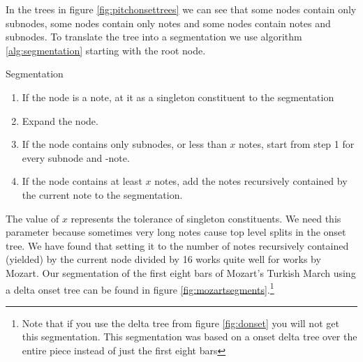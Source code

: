 \documentclass[a4paper,10pt]{article}
\begin{document}
In the trees in figure \ref{fig:pitchonsettrees} we can see that some nodes contain only subnodes, some nodes contain only notes and some nodes contain notes and subnodes. To translate the tree into a segmentation we use algorithm \ref{alg:segmentation} starting with the root node.
\begin{algorithm}
\caption{Segmentation}
\label{alg:segmentation}
\begin{enumerate}
\item If the node is a note, at it as a singleton constituent to the segmentation
\item Expand the node.
\item If the node contains only subnodes, or less than $x$ notes, start from step 1 for every subnode and -note.
\item If the node contains at least $x$ notes, add the notes recursively contained by the current note to the segmentation.
\end{enumerate}
\end{algorithm}

The value of $x$ represents the tolerance of singleton constituents. We need this parameter because sometimes very long notes cause top level splits in the onset tree. We have found that setting it to the number of notes recursively contained (yielded) by the current node divided by 16 works quite well for works by Mozart. Our segmentation of the first eight bars of Mozart's Turkish March using a delta onset tree can be found in figure \ref{fig:mozartsegments}.\footnote{Note that if you use the delta tree from figure  \ref{fig:donset} you will not get this segmentation. This segmentation was based on a onset delta tree over the entire piece instead of just the first eight bars}


\end{document}
